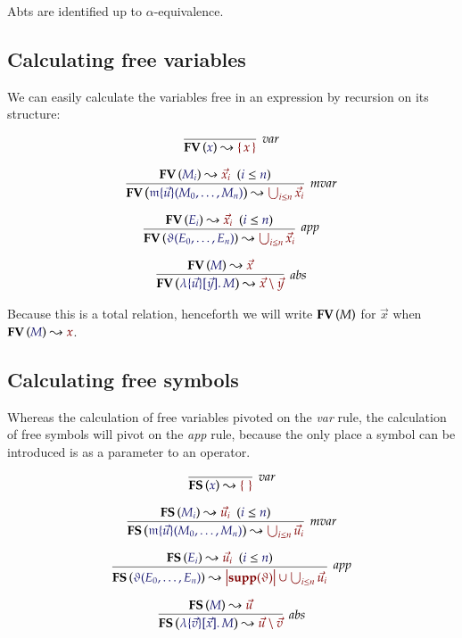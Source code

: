 \documentclass[11pt]{article}
\theoremstyle{definition}
\theoremstyle{remark}
\numberwithin{equation}{section}
\newcommand\Supp[1]{\mathbf{supp}(#1)}
\newcommand\CalcFV[2]{
  \FV{\IMode{#1}}\leadsto \OMode{#2}
}
\newcommand\CalcFS[2]{
  \FS{\IMode{#1}}\leadsto \OMode{#2}
}
\begin{document}
Abts are identified up to $\alpha$-equivalence.

\subsection{Calculating free variables}

We can easily calculate the variables free in an expression by recursion on its
structure:

\begin{gather*}
  \infer[\textit{var}]{
    \CalcFV{x}{\MkSet{x}}
  }{
  }\\[6pt]
  \infer[\textit{mvar}]{
    \CalcFV{
      \MApp{\MV{m}}{\vec{u}}{M_0,\dots,M_n}
    }{
      \bigcup_{i\leq n} \vec{x}_i
    }
  }{
    \HypJ{
      \CalcFV{M_i}{\vec{x}_i}
    }{
      \Leq{i}{n}
    }
  }\\[6pt]
  \infer[\textit{app}]{
    \CalcFV{
      \App{\vartheta}{E_0,\dots,E_n}
    }{
      \bigcup_{i\leq n} \vec{x}_i
    }
  }{
    \HypJ{
      \CalcFV{E_i}{\vec{x}_i}
    }{
      \Leq{i}{n}
    }
  }\\[6pt]
  \infer[\textit{abs}]{
    \CalcFV{
      \MkBTm{\vec{u}}{\vec{y}}{M}
    }{
      \vec{x}\setminus\vec{y}
    }
  }{
    \CalcFV{M}{\vec{x}}
  }
\end{gather*}

Because this is a total relation, henceforth we will write $\mathbf{FV}\left(M\right)$ for
$\vec{x}$ when $\CalcFV{M}{x}$.

\subsection{Calculating free symbols}

Whereas the calculation of free variables pivoted on the \emph{var} rule, the
calculation of free symbols will pivot on the \emph{app} rule, because the only
place a symbol can be introduced is as a parameter to an operator.

\begin{gather*}
  \infer[\textit{var}]{
    \CalcFS{x}{\MkSet{}}
  }{
  }\\[6pt]
  \infer[\textit{mvar}]{
    \CalcFS{
      \MApp{\MV{m}}{\vec{u}}{M_0,\dots,M_n}
    }{
      \bigcup_{i\leq n} \vec{u}_i
    }
  }{
    \HypJ{
      \CalcFS{M_i}{\vec{u}_i}
    }{
      \Leq{i}{n}
    }
  }\\[6pt]
  \infer[\textit{app}]{
    \CalcFS{
      \App{\vartheta}{E_0,\dots,E_n}
    }{
      \Dom{\Supp{\vartheta}} \cup \bigcup_{i\leq n} \vec{u}_i
    }
  }{
    \HypJ{
      \CalcFS{E_i}{\vec{u}_i}
    }{
      \Leq{i}{n}
    }
  }\\[6pt]
  \infer[\textit{abs}]{
    \CalcFS{
      \MkBTm{\vec{v}}{\vec{x}}{M}
    }{
      \vec{u}\setminus\vec{v}
    }
  }{
    \CalcFS{M}{\vec{u}}
  }
\end{gather*}
\end{document}

